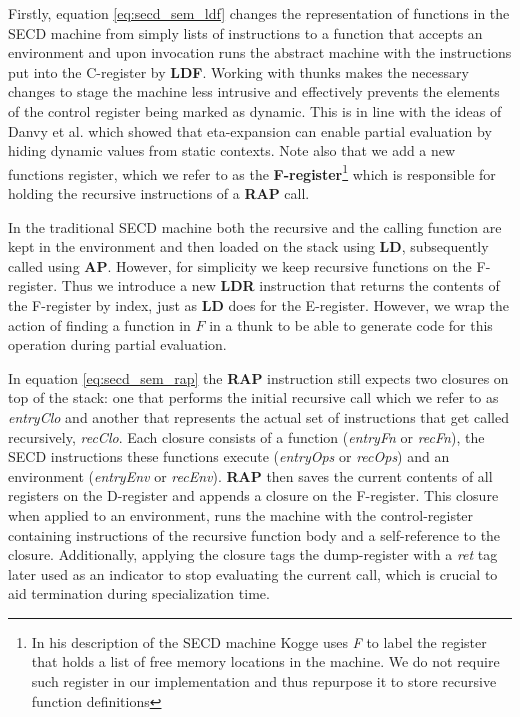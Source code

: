 \documentclass[a4paper,12pt,twoside,openright]{report}
\theoremstyle{definition}
\newcommand{\ts}{\textquotesingle}
\begin{document}
Firstly, equation \ref{eq:secd_sem_ldf} changes the representation of functions in the SECD machine from simply lists of instructions to a function that accepts an environment and upon invocation runs the abstract machine with the instructions put into the C-register by \textbf{LDF}. Working with thunks makes the necessary changes to stage the machine less intrusive and effectively prevents the elements of the control register being marked as dynamic. This is in line with the ideas of Danvy et al. \cite{danvy1995essence} which showed that eta-expansion can enable partial evaluation by hiding dynamic values from static contexts. Note also that we add a new functions register, which we refer to as the \textbf{F-register}\footnote{In his description of the SECD machine Kogge \cite{kogge1990architecture} uses \textit{F} to label the register that holds a list of free memory locations in the machine. We do not require such register in our implementation and thus repurpose it to store recursive function definitions} which is responsible for holding the recursive instructions of a \textbf{RAP} call.

In the traditional SECD machine both the recursive and the calling function are kept in the environment and then loaded on the stack using \textbf{LD}, subsequently called using \textbf{AP}. However, for simplicity we keep recursive functions on the F-register. Thus we introduce a new \textbf{LDR} instruction that returns the contents of the F-register by index, just as \textbf{LD} does for the E-register. However, we wrap the action of finding a function in $F$ in a thunk to be able to generate code for this operation during partial evaluation.

In equation \ref{eq:secd_sem_rap} the \textbf{RAP} instruction still expects two closures on top of the stack: one that performs the initial recursive call which we refer to as \textit{entryClo} and another that represents the actual set of instructions that get called recursively, \textit{recClo}. Each closure consists of a function (\textit{entryFn} or \textit{recFn}), the SECD instructions these functions execute (\textit{entryOps} or \textit{recOps}) and an environment (\textit{entryEnv} or \textit{recEnv}). \textbf{RAP} then saves the current contents of all registers on the D-register and appends a closure on the F-register. This closure when applied to an environment, runs the machine with the control-register containing instructions of the recursive function body and a self-reference to the closure. Additionally, applying the closure tags the dump-register with a \textit{{\ts}ret} tag later used as an indicator to stop evaluating the current call, which is crucial to aid termination during specialization time.
\end{document}
